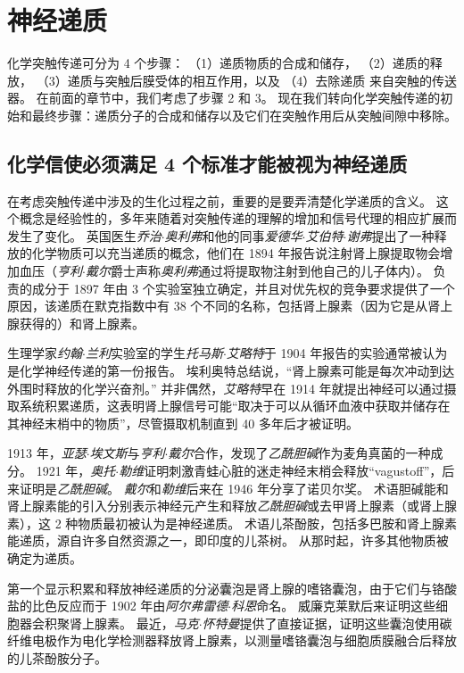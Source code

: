 \chapter{神经递质} \label{chap:chap16}

化学突触传递可分为 4 个步骤：
（1）递质物质的合成和储存，
（2）递质的释放，
（3）递质与突触后膜受体的相互作用，以及
（4）去除递质 来自突触的传送器。
在前面的章节中，我们考虑了步骤 2 和 3。
现在我们转向化学突触传递的初始和最终步骤：递质分子的合成和储存以及它们在突触作用后从突触间隙中移除。



\section{化学信使必须满足 4 个标准才能被视为神经递质}

在考虑突触传递中涉及的生化过程之前，重要的是要弄清楚化学递质的含义。
这个概念是经验性的，多年来随着对突触传递的理解的增加和信号代理的相应扩展而发生了变化。
英国医生\textit{乔治$\cdot$奥利弗}和他的同事\textit{爱德华$\cdot$艾伯特$\cdot$谢弗}提出了一种释放的化学物质可以充当递质的概念，他们在 1894 年报告说注射肾上腺提取物会增加血压（\textit{亨利$\cdot$戴尔}爵士声称\textit{奥利弗}通过将提取物注射到他自己的儿子体内）。
负责的成分于 1897 年由 3 个实验室独立确定，并且对优先权的竞争要求提供了一个原因，该递质在默克指数中有 38 个不同的名称，包括肾上腺素（因为它是从肾上腺获得的）和肾上腺素。


生理学家\textit{约翰$\cdot$兰利}实验室的学生\textit{托马斯$\cdot$艾略特}于 1904 年报告的实验通常被认为是化学神经传递的第一份报告。
埃利奥特总结说，“肾上腺素可能是每次冲动到达外围时释放的化学兴奋剂。” 
并非偶然，\textit{艾略特}早在 1914 年就提出神经可以通过摄取系统积累递质，这表明肾上腺信号可能“取决于可以从循环血液中获取并储存在其神经末梢中的物质”，尽管摄取机制直到 40 多年后才被证明。


1913 年，\textit{亚瑟$\cdot$埃文斯}与\textit{亨利$\cdot$戴尔}合作，发现了\textit{乙酰胆碱}作为麦角真菌的一种成分。
1921 年，\textit{奥托$\cdot$勒维}证明刺激青蛙心脏的迷走神经末梢会释放“vagustoff”，后来证明是\textit{乙酰胆碱}。
\textit{戴尔}和\textit{勒维}后来在 1946 年分享了诺贝尔奖。
术语胆碱能和肾上腺素能的引入分别表示神经元产生和释放\textit{乙酰胆碱}或去甲肾上腺素（或肾上腺素），这 2 种物质最初被认为是神经递质。
术语儿茶酚胺，包括多巴胺和肾上腺素能递质，源自许多自然资源之一，即印度的儿茶树。
从那时起，许多其他物质被确定为递质。


第一个显示积累和释放神经递质的分泌囊泡是肾上腺的嗜铬囊泡，由于它们与铬酸盐的比色反应而于 1902 年由\textit{阿尔弗雷德$\cdot$科恩}命名。
威廉克莱默后来证明这些细胞器会积聚肾上腺素。
最近，\textit{马克$\cdot$怀特曼}提供了直接证据，证明这些囊泡使用碳纤维电极作为电化学检测器释放肾上腺素，以测量嗜铬囊泡与细胞质膜融合后释放的儿茶酚胺分子。


